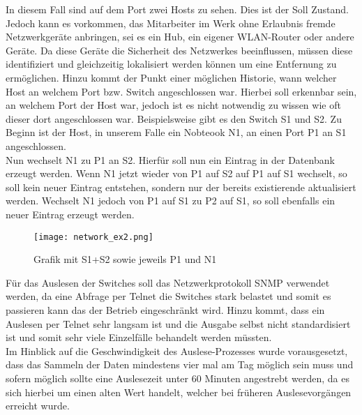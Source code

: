 In diesem Fall sind auf dem Port zwei Hosts zu sehen.
Dies ist der Soll Zustand. Jedoch kann es vorkommen, das Mitarbeiter im Werk ohne Erlaubnis fremde Netzwerkgeräte anbringen, sei es ein Hub, ein eigener WLAN-Router oder andere Geräte. Da diese Geräte die Sicherheit des Netzwerkes beeinflussen, müssen diese identifiziert und gleichzeitig lokalisiert werden können um eine Entfernung zu ermöglichen.
Hinzu kommt der Punkt einer möglichen Historie, wann welcher Host an welchem Port bzw. Switch angeschlossen war. Hierbei soll erkennbar sein, an welchem Port der Host war, jedoch ist es nicht notwendig zu wissen wie oft dieser dort angeschlossen war. Beispielsweise gibt es den Switch S1 und S2. Zu Beginn ist der Host, in unserem Falle ein Nobteook N1, an einen Port P1 an S1 angeschlossen.\\
Nun wechselt N1 zu P1 an S2.
Hierfür soll nun ein Eintrag in der Datenbank erzeugt werden. Wenn N1 jetzt wieder von P1 auf S2 auf P1 auf S1 wechselt, so soll kein neuer Eintrag entstehen, sondern nur der bereits existierende aktualisiert werden. Wechselt N1 jedoch von P1 auf S1 zu P2 auf S1, so soll ebenfalls ein neuer Eintrag erzeugt werden.\\

\begin{figure}[H]
\centering
\texttt{[image: network\_ex2.png]}
\caption{Grafik mit S1+S2 sowie jeweils P1 und N1}
\label{fig:show_s1_s2_p1_n1}
\end{figure}


Für das Auslesen der Switches soll das Netzwerkprotokoll SNMP verwendet werden, da eine Abfrage per Telnet die Switches stark belastet und somit es passieren kann das der Betrieb eingeschränkt wird. Hinzu kommt, dass ein Auslesen per Telnet sehr langsam ist und die Ausgabe selbst nicht standardisiert ist und somit sehr viele Einzelfälle behandelt werden müssten.\\
Im Hinblick auf die Geschwindigkeit des Auslese-Prozesses wurde vorausgesetzt, dass das Sammeln der Daten mindestens vier mal am Tag möglich sein muss und sofern möglich sollte eine Auslesezeit unter 60 Minuten angestrebt werden, da es sich hierbei um einen alten Wert handelt, welcher bei früheren Auslesevorgängen erreicht wurde.\\

